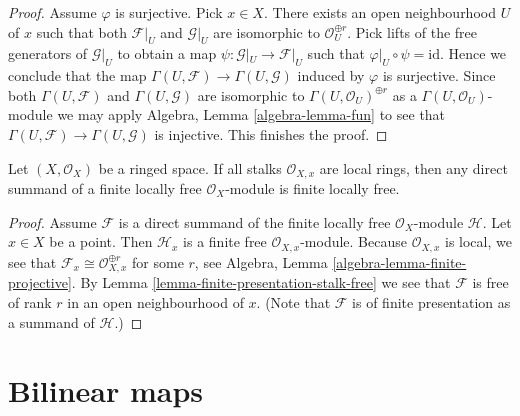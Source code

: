 \begin{proof}
Assume $\varphi$ is surjective. Pick $x \in X$.
There exists an open neighbourhood $U$ of $x$
such that both $\mathcal{F}|_U$ and $\mathcal{G}|_U$ are
isomorphic to $\mathcal{O}_U^{\oplus r}$.
Pick lifts of the free generators of $\mathcal{G}|_U$
to obtain a map $\psi : \mathcal{G}|_U \to \mathcal{F}|_U$
such that $\varphi|_U \circ \psi = \text{id}$.
Hence we conclude that the map
$\Gamma(U, \mathcal{F}) \to \Gamma(U, \mathcal{G})$
induced by $\varphi$ is surjective. Since both
$\Gamma(U, \mathcal{F})$ and $\Gamma(U, \mathcal{G})$
are isomorphic to $\Gamma(U, \mathcal{O}_U)^{\oplus r}$
as a $\Gamma(U, \mathcal{O}_U)$-module we may
apply Algebra, Lemma \ref{algebra-lemma-fun} to see that
$\Gamma(U, \mathcal{F}) \to \Gamma(U, \mathcal{G})$
is injective. This finishes the proof.
\end{proof}

\begin{lemma}
\label{lemma-direct-summand-of-locally-free-is-locally-free}
Let $(X, \mathcal{O}_X)$ be a ringed space. If all stalks $\mathcal{O}_{X, x}$
are local rings, then any direct summand of a finite locally free
$\mathcal{O}_X$-module is finite locally free.
\end{lemma}

\begin{proof}
Assume $\mathcal{F}$ is a direct summand of the finite locally free
$\mathcal{O}_X$-module $\mathcal{H}$.
Let $x \in X$ be a point. Then $\mathcal{H}_x$ is a finite free
$\mathcal{O}_{X, x}$-module.
Because $\mathcal{O}_{X, x}$ is local, we see that
$\mathcal{F}_x \cong \mathcal{O}_{X, x}^{\oplus r}$ for some $r$, see
Algebra, Lemma \ref{algebra-lemma-finite-projective}.
By Lemma \ref{lemma-finite-presentation-stalk-free}
we see that $\mathcal{F}$ is free of rank $r$ in an open neighbourhood of $x$.
(Note that $\mathcal{F}$ is of finite presentation as a summand of
$\mathcal{H}$.)
\end{proof}





\section{Bilinear maps}
\label{section-bilinear}



